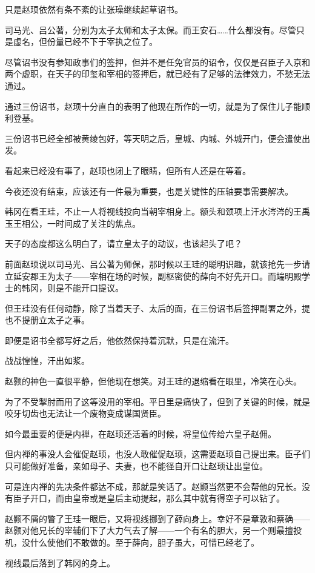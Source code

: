 只是赵顼依然有条不紊的让张璪继续起草诏书。

司马光、吕公著，分别为太子太师和太子太保。而王安石……什么都没有。尽管只是虚名，但份量已经不下于宰执之位了。

尽管诏书没有参知政事们的签押，但并不是任免官员的诏令，仅仅是召臣子入京和两个虚职，在天子的印玺和宰相的签押后，就已经有了足够的法律效力，不愁无法通过。

通过三份诏书，赵顼十分直白的表明了他现在所作的一切，就是为了保住儿子能顺利登基。

三份诏书已经全部被黄绫包好，等天明之后，皇城、内城、外城开门，便会遣使出发。

看起来已经没有事了，赵顼也闭上了眼睛，但所有人还是在等着。

今夜还没有结束，应该还有一件最为重要，也是关键性的压轴要事需要解决。

韩冈在看王珪，不止一人将视线投向当朝宰相身上。额头和颈项上汗水涔涔的王禹玉王相公，一时间成了关注的焦点。

天子的态度都这么明白了，请立皇太子的动议，也该起头了吧？

前面赵顼说以司马光、吕公著为师保，那时候以王珪的聪明识趣，就该抢先一步请立延安郡王为太子——宰相在场的时候，副枢密使的薛向不好先开口。而端明殿学士的韩冈，则是不能开口提议。

但王珪没有任何动静，除了当着天子、太后的面，在三份诏书后签押副署之外，提也不提册立太子之事。

即便是诏书全都写好之后，他依然保持着沉默，只是在流汗。

战战惶惶，汗出如浆。

赵颢的神色一直很平静，但他现在想笑。对王珪的退缩看在眼里，冷笑在心头。

为了不受掣肘而用了这等没用的宰相。平日里是痛快了，但到了关键的时候，就是咬牙切齿也无法让一个废物变成谋国贤臣。

如今最重要的便是内禅，在赵顼还活着的时候，将皇位传给六皇子赵佣。

但内禅的事没人会催促赵顼，也没人敢催促赵顼，这需要赵顼自己提出来。臣子们只可能做好准备，亲如母子、夫妻，也不能径自开口让赵顼让出皇位。

可是连内禅的先决条件都达不成，那就是笑话了。赵颢当然更不会帮他的兄长。没有臣子开口，而由皇帝或是皇后主动提起，那么其中就有得空子可以钻了。

赵颢不屑的瞥了王珪一眼后，又将视线挪到了薛向身上。幸好不是章敦和蔡确——赵颢对他兄长的宰辅们下了大力气去了解——一个有名的胆大，另一个则最擅投机，没什么使他们不敢做的。至于薛向，胆子虽大，可惜已经老了。

视线最后落到了韩冈的身上。

